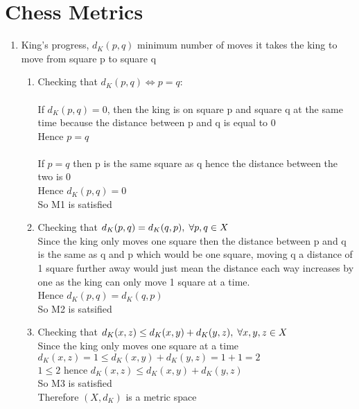 \documentclass[,oneside]{article}
\numberwithin{equation}{section}
\begin{document}
\section{\large{Chess Metrics}}
   \begin{enumerate}[label=(\roman*)]
   \item King's progress, $d_K(p,q)$ minimum number of moves it takes the king to move from square p to square q  \\
   \begin{enumerate}[label=\alph*)]
   \item Checking that $d_K(p,q)\Leftrightarrow p=q$:\\
   \\If $d_K(p,q)=0$, then the king is on square p and square q at the same time because the distance between p and q is equal to 0
   \\Hence $p=q$\\
   \\If $p=q$ then p is the same square as q hence the distance between the two is 0
   \\Hence $d_K(p,q)=0$\\
   So M1 is satisfied\\
   \item Checking that $d_K(p,q)=d_K(q,p), \hspace{0.1cm}\forall p,q \in X$\\
   Since the king only moves one square then the distance between p and q is the same as q and p which would be one square, moving q a distance of 1 square further away would just mean the distance each way increases by one as the king can only move 1 square at a time.
   \\Hence $d_K(p,q)=d_K(q,p)$\\
   So M2 is satsified\\
   \item Checking that $d_K(x,z) \leq d_K(x,y) + d_K(y,z), \hspace{0.1cm} \forall x,y,z \in X$\\
   Since the king only moves one square at a time\\
   $d_K(x,z)=1 \leq d_K(x,y)+d_K(y,z)=1+1=2$\\
   $1 \leq 2$ hence $d_K(x,z) \leq d_K(x,y) + d_K(y,z)$
   \\So M3 is satisfied
   \\Therefore $(X,d_K)$ is a metric space\\
   \end{enumerate}
   

\end{enumerate}
\end{document}
